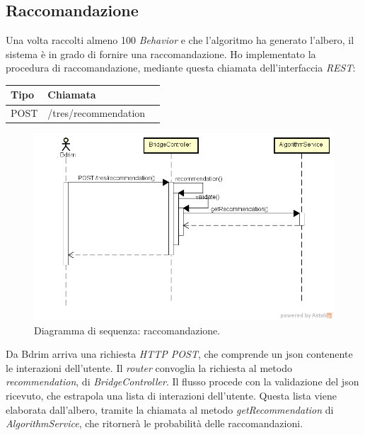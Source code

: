 \subsection{Raccomandazione}
Una volta raccolti almeno 100 \emph{Behavior} e che l'algoritmo ha generato l'albero, il sistema è in grado di fornire una raccomandazione. Ho implementato la procedura di raccomandazione, mediante questa chiamata dell'interfaccia \emph{REST}:
\def\arraystretch{1.5}
\begin{longtable}{|p{2.5cm}|p{5cm}|l|}
\hline
\textbf{Tipo} &	\textbf{Chiamata}	\\\hline
POST	&	/tres/recommendation	 \\\hline
\end{longtable}
\begin{figure}[h]
\centering
\includegraphics[scale=0.42]{immagini/DSracommandazione}
\caption{Diagramma di sequenza: raccomandazione.}
\label{fig:get-recommendation}
\end{figure}
Da Bdrim arriva una richiesta \emph{HTTP POST}, che comprende un \gls{json} contenente le interazioni dell'utente. Il \emph{router} convoglia la richiesta al metodo \emph{recommendation}, di \emph{BridgeController}. Il flusso procede con la validazione del \gls{json} ricevuto, che estrapola una lista di interazioni dell'utente. Questa lista viene elaborata dall'albero, tramite la chiamata al metodo \emph{getRecommendation} di \emph{AlgorithmService}, che ritornerà le probabilità delle raccomandazioni. 




\newpage

